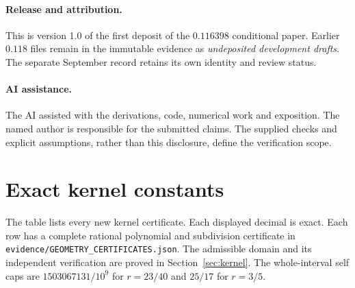 \documentclass[11pt,a4paper]{article}
\theoremstyle{definition}\newtheorem{definition}[theorem]{Definition}
\theoremstyle{remark}\newtheorem{remark}[theorem]{Remark}
\begin{document}
\paragraph{Release and attribution.}
This is version 1.0 of the first deposit of the $0.116398$ conditional
paper. Earlier $0.118$ files remain in the immutable evidence as
\emph{undeposited development drafts}. The separate September record \cite{raymond149} retains its own
identity and review status.

\paragraph{AI assistance.}
The AI assisted with the derivations, code, numerical work and exposition.
The named author is responsible for the submitted claims. The supplied
checks and explicit assumptions, rather than this disclosure, define the
verification scope.

\appendix
\section{Exact kernel constants}\label{app:catalogue}
The table lists every new kernel certificate. Each displayed decimal is
exact. Each row has a complete rational polynomial and subdivision
certificate in \texttt{evidence/GEOMETRY\_CERTIFICATES.json}. The admissible
domain and its independent verification are proved in
Section~\ref{sec:kernel}. The whole-interval self caps are
$1503067131/10^9$ for $r=23/40$ and $25/17$ for $r=3/5$.
\end{document}
